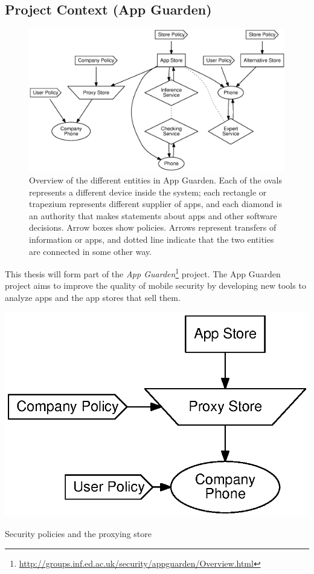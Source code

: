 \documentclass[a4paper,sfsidenotes]{tufte-book}
\begin{document}
\subsection{Project Context (App Guarden)}

\begin{figure}\label{fig:ag}
  \includegraphics[width=\linewidth]{img/appguarden.eps}
  \caption{Overview of the different entities in App Guarden.  Each of the ovals
  represents a different device inside the system; each rectangle or trapezium
  represents  different supplier of apps, and each diamond is an authority that
  makes statements about apps and other software decisions.  Arrow boxes show
policies.  Arrows represent transfers of information or apps, and dotted line
indicate that the two entities are connected in some other way.}
\end{figure}

This thesis will form part of the \emph{App
Guarden}\footnote{\url{http://groups.inf.ed.ac.uk/security/appguarden/Overview.html}}
project.  The App Guarden project aims to improve the quality of mobile security
by developing new tools to analyze apps and the app stores that sell them.

\begin{marginfigure}
  \label{fig:proxy}
  \includegraphics[width=\linewidth]{img/proxystore.eps}
  \caption{Security policies and the proxying store}
\end{marginfigure}
\end{document}
